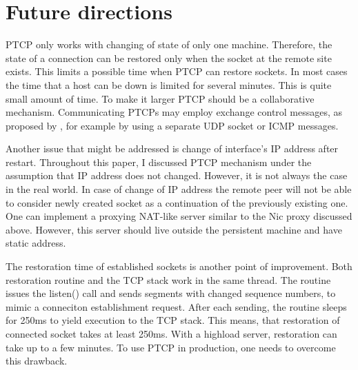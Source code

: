\section{Future directions}

PTCP only works with changing of state of only one machine. Therefore, the
state of a connection can be restored only when the socket at the remote site
exists. This limits a possible time when PTCP can restore sockets. In most
cases the time that a host can be down is limited for several minutes. This is
quite small amount of time. To make it larger PTCP should be a collaborative
mechanism. Communicating PTCPs may employ exchange control messages, as
proposed by \cite{rocks_racks}, for example by using a separate UDP socket or
ICMP messages.

Another issue that might be addressed is change of interface's IP address after
restart. Throughout this paper, I discussed PTCP mechanism under the assumption
that IP address does not changed. However, it is not always the case in the
real world. In case of change of IP address the remote peer will not be able
to consider newly created socket as a continuation of the previously existing
one. One can implement a proxying NAT-like server similar to the Nic proxy
discussed above. However, this server should live outside the persistent
machine and have static address.

The restoration time of established sockets is another point of improvement.
Both restoration routine and the TCP stack work in the same thread. The
routine issues the listen() call and sends segments with changed sequence
numbers, to mimic a conneciton establishment request. After each sending, the
routine sleeps for 250ms to yield execution to the TCP stack. This means, that
restoration of connected socket takes at least 250ms. With a highload server,
restoration can take up to a few minutes. To use PTCP in production, one needs
to overcome this drawback.

